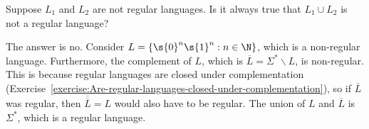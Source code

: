 \begin{flex}
\begin{exercise} \label{exercise:Union-of-irregular-languages}
Suppose $L_1$ and $L_2$ are not regular languages. 
Is it always true that $L_1 \cup L_2$ is not a regular language?
\end{exercise}


\begin{solution}
The answer is no. Consider $L = \{\s{0}^n\s{1}^n : n \in \N\}$, which is a non-regular language. Furthermore, the complement of $L$, which is $\overline{L} = \Sigma^* \backslash L$, is non-regular. This is because regular languages are closed under complementation (Exercise~\ref{exercise:Are-regular-languages-closed-under-complementation}), so if $\overline{L}$ was regular, then $\overline{\overline{L}} = L$ would also have to be regular. The union of $L$ and $\overline{L}$ is $\Sigma^*$, which is a regular language.
\end{solution}
\end{flex}


